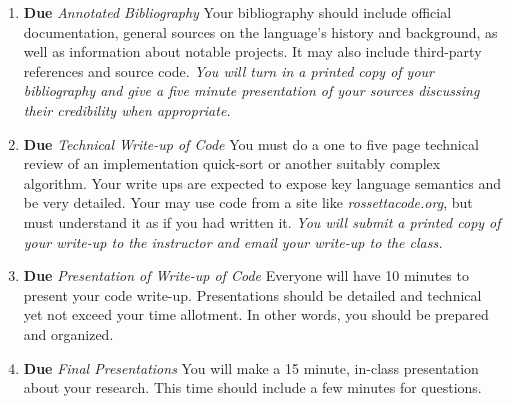 \documentclass[10pt]{article}
\begin{document}
\begin{enumerate}
\item \textbf{Due } \textit{Annotated Bibliography }
Your bibliography should include official documentation, general sources on the language's history and background, as well as information about notable projects.  It may also include third-party references and source code.  \textit{You will turn in a printed copy of your bibliography and give a five minute presentation of your sources discussing their credibility when appropriate.}
\item \textbf{Due } \textit{Technical Write-up of Code}
You must do a one to five page technical review of an implementation quick-sort or another suitably complex algorithm.  Your write ups are expected to expose key language semantics and be very detailed.  Your may use code from a site like \textit{rossettacode.org}, but must understand it  as if you had written it.  \textit{You will submit a printed copy of your write-up to the instructor and email your write-up to the class.}  
\item \textbf{Due } \textit{Presentation of Write-up of Code}
Everyone will have 10 minutes to present your code write-up. Presentations should be detailed and technical yet not exceed your time allotment. In other words, you should be prepared and organized. 
\item \textbf{Due } \textit{Final Presentations}
You will make a 15 minute, in-class presentation about your research.  This time should include a few minutes for questions.  
\end{enumerate}
\end{document}
